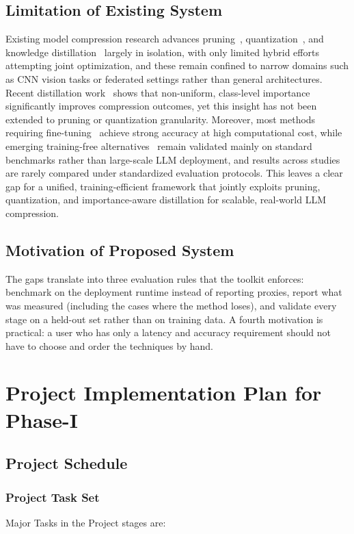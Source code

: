 \documentclass[oneside,a4paper,12pt]{report}
\begin{document}
\section{Limitation of Existing System }
Existing model compression research advances pruning~\cite{he2018}, quantization~\cite{chen2021,abdelsalam2025,fang2026}, and knowledge distillation~\cite{hinton2015,xu2024,zhao2022,chen2020} largely in isolation, with only limited hybrid efforts~\cite{chae2026,wang2025,khan2025} attempting joint optimization, and these remain confined to narrow domains such as CNN vision tasks or federated settings rather than general architectures. Recent distillation work~\cite{xu2024,zhao2022} shows that non-uniform, class-level importance significantly improves compression outcomes, yet this insight has not been extended to pruning or quantization granularity. Moreover, most methods requiring fine-tuning~\cite{he2018,wang2025} achieve strong accuracy at high computational cost, while emerging training-free alternatives~\cite{abdelsalam2025,zhou2026} remain validated mainly on standard benchmarks rather than large-scale LLM deployment, and results across studies are rarely compared under standardized evaluation protocols. This leaves a clear gap for a unified, training-efficient framework that jointly exploits pruning, quantization, and importance-aware distillation for scalable, real-world LLM compression.
\section{Motivation of Proposed System }
The gaps translate into three evaluation rules that the toolkit enforces: benchmark on the deployment runtime instead of reporting proxies, report what was measured (including the cases where the method loses), and validate every stage on a held-out set rather than on training data. A fourth motivation is practical: a user who has only a latency and accuracy requirement should not have to choose and order the techniques by hand.



\chapter{Project Implementation Plan for Phase-I}
 \section{Project Schedule} 
 \subsection{Project Task Set}
 Major Tasks in the Project stages are:
\end{document}
